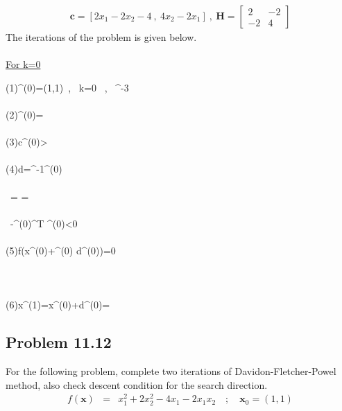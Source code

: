 \documentclass[]{report}
\begin{document}
\begin{eqnarray*}
\mathbf{c}=\left[2x_1-2x_2-4 \ , \ 4x_2-2x_1\right] \ , \ \mathbf{H}=\left[\begin{array}{cc}
2 & -2 \\
-2 & 4\end{array}\right]
\end{eqnarray*}
The iterations of the problem is given below.\\~\\
\underline{For k=0}
\begin{program}
\left(1\right)\quad {}^{(0)}=\left(1,1\right)\ , \, k=0 \ , \ ^{-3}\\~ \\
\left(2\right)\quad {}^{(0)}=\left[-4 \ , \ 2\right]\\~  \\
\left(3\right)\quad \lvert \mathbf c^{(0)}>\epsilon\\~  \\
\left(4\right)\quad \mathbf d=^{-1}^{(0)}\\~  \\
\quad \quad \quad \ = \left[\begin{array}{cc}1 & 0.5 \\ 0.5 & 0.5 \end{array}\right]\left[\begin{array}{c}-4 \\ 2\end{array}\right]=\left[\begin{array}{c}-3 \\ -1\end{array}\right]\\~  \\
\quad \quad \quad \ -{^{(0)}}^{\mathrm T} ^{(0)}<0 \Longrightarrow {} \\~\\
\left(5\right)\quad \delta f\left(\mathbf x^{(0)}+\alpha^{(0)} \mathbf d^{(0)}\right)=0\\~\\
\quad \quad \quad {}\\~\\
\left(6\right)\quad \mathbf x^{(1)}=\mathbf x^{(0)}+\mathbf d^{(0)}=\left[4\ , \ 2\right]
\end{program}
\subsection*{Problem 11.12}
For the following problem, complete two iterations of Davidon-Fletcher-Powel method, also check descent condition for the search direction.
\begin{eqnarray*}
f\left(\mathbf x\right)&=&x_1^2+2x_2^2-4x_1-2x_1x_2 \quad ; \quad \mathbf{x}_0=\left(1,1\right)
\end{eqnarray*}
\end{document}
